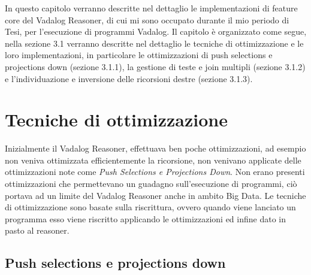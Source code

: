 In questo capitolo verranno descritte nel dettaglio le implementazioni di feature core del Vadalog Reasoner, di cui mi sono occupato durante il mio periodo di Tesi, per l'esecuzione di programmi Vadalog. \newline
Il capitolo è organizzato come segue, nella sezione 3.1 verranno descritte nel dettaglio le tecniche di ottimizzazione e le loro implementazioni, in particolare le ottimizzazioni di push selections e projections down (sezione 3.1.1), la gestione di teste e join multipli (sezione 3.1.2) e l'individuazione e inversione delle ricorsioni destre (sezione 3.1.3). \newline

\section{Tecniche di ottimizzazione}

Inizialmente il Vadalog Reasoner, effettuava ben poche ottimizzazioni, ad esempio non veniva ottimizzata efficientemente la ricorsione, non venivano applicate delle ottimizzazioni note come \emph{Push Selections e Projections Down}. Non erano presenti ottimizzazioni che permettevano un guadagno sull'esecuzione di programmi, ciò portava ad un limite del Vadalog Reasoner anche in ambito Big Data. \newline
Le tecniche di ottimizzazione sono basate sulla riscrittura, ovvero quando viene lanciato un programma esso viene riscritto applicando le ottimizzazioni ed infine dato in pasto al reasoner.

\subsection{Push selections e projections down}

